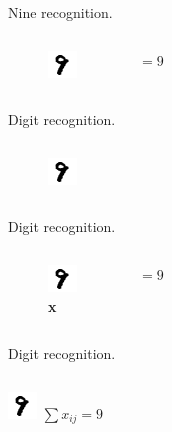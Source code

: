 \documentclass[10pt]{beamer}
\begin{document}
\begin{frame}[fragile]{Nine recognition.}
\begin{columns}
\begin{figure}
    \centering
    \includegraphics[scale=4]{images/nine.png} 
\end{figure}
\centering
 $= 9$
\end{columns}
\end{frame}

\begin{frame}[fragile]{Digit recognition.}
\begin{columns}
\begin{figure}
    \centering
    \includegraphics[scale=4]{images/ninepixeled.png} 
\end{figure}
\centering
 $ $
\end{columns}
\end{frame}

\begin{frame}[fragile]{Digit recognition.}
\begin{columns}
\begin{figure}
    \centering
    \includegraphics[scale=4]{images/nine.png} 
    \caption{\textbf{x}}
\end{figure}
\centering
 $= 9$
\end{columns}
\end{frame}

\begin{frame}[fragile]{Digit recognition.}
\begin{columns}
\centering
\includegraphics[scale=2]{images/nine.png} 
\centering
 $\sum x_{ij} = 9$
\end{columns}
\end{frame}

\end{document}
